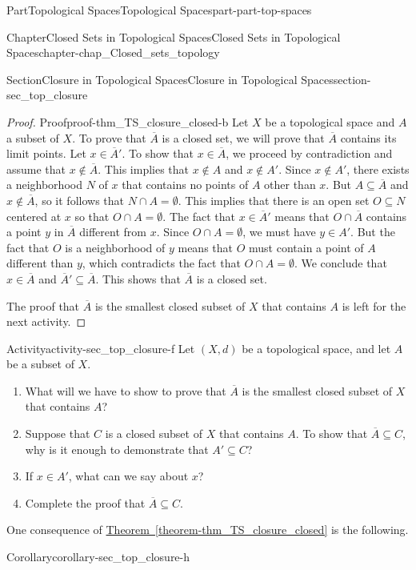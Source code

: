 \documentclass[oneside,10pt,]{book}
\newcommand{\xreffont}{\relax}
\numberwithin{equation}{chapter}
\begin{document}
\begin{partptx}{Part}{Topological Spaces}{}{Topological Spaces}{}{}{part-part-top-spaces}
\begin{chapterptx}{Chapter}{Closed Sets in Topological Spaces}{}{Closed Sets in Topological Spaces}{}{}{chapter-chap_Closed_sets_topology}
\begin{sectionptx}{Section}{Closure in Topological Spaces}{}{Closure in Topological Spaces}{}{}{section-sec_top_closure}
\begin{proof}{Proof}{}{proof-thm_TS_closure_closed-b}
Let \(X\) be a topological space and \(A\) a subset of \(X\). To prove that \(\overline{A}\) is a closed set, we will prove that \(\overline{A}\) contains its limit points. Let \(x \in \overline{A}'\). To show that \(x \in \overline{A}\), we proceed by contradiction and assume that \(x \notin \overline{A}\). This implies that \(x \notin A\) and \(x \notin A'\). Since \(x \notin A'\), there exists a neighborhood \(N\) of \(x\) that contains no points of \(A\) other than \(x\). But \(A \subseteq \overline{A}\) and \(x \notin \overline{A}\), so it follows that \(N \cap A = \emptyset\). This implies that there is an open set \(O \subseteq N\) centered at \(x\) so that \(O \cap A = \emptyset\). The fact that \(x \in \overline{A}'\) means that \(O \cap \overline{A}\) contains a point \(y\) in \(\overline{A}\) different from \(x\). Since \(O \cap A = \emptyset\), we must have \(y \in A'\). But the fact that \(O\) is a neighborhood of \(y\) means that \(O\) must contain a point of \(A\) different than \(y\), which contradicts the fact that \(O \cap A = \emptyset\). We conclude that \(x \in \overline{A}\) and \(\overline{A}' \subseteq \overline{A}\). This shows that \(\overline{A}\) is a closed set.%
\par
The proof that \(\overline{A}\) is the smallest closed subset of \(X\) that contains \(A\) is left for the next activity.%
\end{proof}
\begin{activity}{Activity}{}{activity-sec_top_closure-f}%
Let \((X,d)\) be a topological space, and let \(A\) be a subset of \(X\).%
\begin{enumerate}[font=\bfseries,label=(\alph*),ref=\alph*]%
\item{}What will we have to show to prove that \(\overline{A}\) is the smallest closed subset of \(X\) that contains \(A\)?%
\item{}Suppose that \(C\) is a closed subset of \(X\) that contains \(A\). To show that \(\overline{A} \subseteq C\), why is it enough to demonstrate that \(A' \subseteq C\)?%
\item{}If \(x \in A'\), what can we say about \(x\)?%
\item{}Complete the proof that \(\overline{A} \subseteq C\).%
\end{enumerate}%
\end{activity}%
One consequence of \hyperref[theorem-thm_TS_closure_closed]{Theorem~{\xreffont\ref{theorem-thm_TS_closure_closed}}} is the following.%
\begin{corollary}{Corollary}{}{}{corollary-sec_top_closure-h}%

\end{corollary}
\end{sectionptx}
\end{chapterptx}
\end{partptx}
\end{document}
